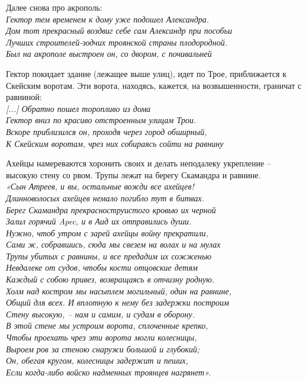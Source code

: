 Далее снова про акрополь:\\

\noindent
\textit{Гектор тем временем к дому уже подошел Александра.\\
Дом тот прекрасный воздвиг себе сам Александр при пособьи\\
Лучших строителей-зодчих троянской страны плодородной.\\
Был на акрополе выстроен он, со двором, с почивальней\\}

Гектор покидает здание (лежащее выше улиц), идет по Трое, приближается к Скейским воротам. Эти ворота, находясь, кажется, на возвышенности, граничат с равниной:\\

\noindent
\textit{[...] Обратно пошел торопливо из дома\\
Гектор вниз по красиво отстроенным улицам Трои.\\
Вскоре приблизился он, проходя через город обширный,\\
К Скейским воротам, чрез них собираясь сойти на равнину\\}

Ахейцы намереваются хоронить своих и делать неподалеку укрепление – высокую стену со рвом. Трупы лежат на берегу Скамандра и равнине.\\

\noindent
\textit{«Сын Атреев, и вы, остальные вожди все ахейцев!\\
Длинноволосых ахейцев немало погибло тут в битвах.\\
Берег Скамандра прекрасноструистого кровью их черной\\
Залил горячий Apec, и в Аид их отправились души.\\
Нужно, чтоб утром с зарей ахейцы войну прекратили,\\
Сами ж, собравшись, сюда мы свезем на волах и на мулах\\
Трупы убитых с равнины, и все предадим их сожженью\\
Невдалеке от судов, чтобы кости отцовские детям\\
Каждый с собою привез, возвращаясь в отчизну родную.\\
Холм над костром мы насыплем могильный, один на равнине,\\
Общий для всех. И вплотную к нему без задержки построим\\
Стену высокую, – нам и самим, и судам в оборону.\\
В этой стене мы устроим ворота, сплоченные крепко,\\
Чтобы проехать чрез эти ворота могли колесницы,\\
Выроем ров за стеною снаружи большой и глубокий;\\
Он, обегая кругом, колесницы задержит и пеших,\\
Если когда-либо войско надменных троянцев нагрянет».\\}

